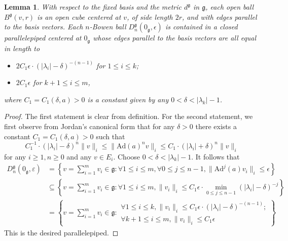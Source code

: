 \documentclass[reqno,12pt]{amsart}
\newtheorem{lemma}[theorem]{Lemma}
\theoremstyle{definition}
\numberwithin{equation}{section}
\newcommand{\Ad}{\mathrm{Ad}}
\newcommand{\Lg}{\mathfrak{g}}
\newcommand{\eps}{\varepsilon}
\begin{document}
{\begin{lemma}\label{L:parallel}
    With respect to the fixed basis and the metric $d^\Lg$ in $\Lg$, each open ball $B^\Lg(v,r)$ is an open cube centered at $v$, of side length $2r$, and with edges parallel to the basis vectors. Each $n$-Bowen ball $D^\Lg_n(0_{\Lg},\epsilon)$ is contained in a closed parallelepiped centered at $0_{\Lg}$ whose edges parallel to the basis vectors are all equal in length to \begin{itemize}
        \item $2C_1\epsilon\cdot(|\lambda_i|-\delta)^{-(n-1)}$ for $1\leq i\leq k$;
        \item $2C_1\epsilon$ for $k+1\leq i\leq m$,
    \end{itemize}
    where $C_1=C_1(\delta,a)>0$ is a constant given by any $0<\delta<|\lambda_k|-1$.
\end{lemma}
\begin{proof}
    The first statement is clear from definition. For the second statement, we first observe from Jordan's canonical form that for any $\delta>0$ there exists a constant $C_1=C_1(\delta,a)>0$ such that $$
    C_1^{-1}\cdot (|\lambda_i|-\delta)^n\|v\|_i\leq \|\Ad(a)^nv\|_i\leq C_1\cdot (|\lambda_i|+\delta)^n\|v\|_i
    $$
    for any $i\geq 1,n\geq 0$ and any $v\in E_i$. Choose $0<\delta<|\lambda_k|-1$. It follows that \begin{equation*}
    \begin{aligned}
        D^\Lg_n(0_{\Lg},\eps)&=\left\{v=\sum_{i=1}^mv_i\in\Lg: \forall 1\leq i\leq m,\forall 0\leq j\leq n-1,\|\Ad^j(a)v_i\|_i\leq \epsilon\right\}\\
        &\subseteq\left\{v=\sum_{i=1}^mv_i\in\Lg: \forall 1\leq i\leq m,\|v_i\|_i\leq C_1\epsilon\cdot\min_{0\leq j\leq n-1}(|\lambda_i|-\delta)^{-j}\right\}\\
        &=\left\{v=\sum_{i=1}^mv_i\in\Lg: 
        \begin{matrix}
\forall 1\leq i\leq k,\|v_i\|_i\leq C_1\epsilon\cdot(|\lambda_i|-\delta)^{-(n-1)};\\
\forall k+1\leq i\leq m,\|v_i\|_i\leq C_1\epsilon
        \end{matrix}
  \right\}
    \end{aligned}
    \end{equation*}
    This is the desired parallelepiped.
\end{proof}

}
\end{document}
